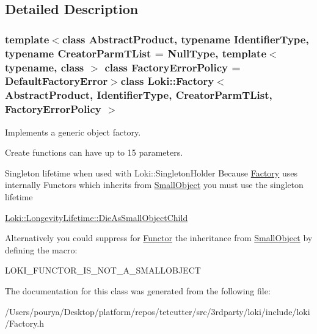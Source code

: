 \subsection{Detailed Description}
\subsubsection*{template$<$class Abstract\+Product, typename Identifier\+Type, typename Creator\+Parm\+T\+List = Null\+Type, template$<$ typename, class $>$ class Factory\+Error\+Policy = Default\+Factory\+Error$>$class Loki\+::\+Factory$<$ Abstract\+Product, Identifier\+Type, Creator\+Parm\+T\+List, Factory\+Error\+Policy $>$}

Implements a generic object factory.

Create functions can have up to 15 parameters.

\begin{DoxyParagraph}{Singleton lifetime when used with Loki\+:\+:Singleton\+Holder}
Because \hyperlink{classLoki_1_1Factory}{Factory} uses internally Functors which inherits from \hyperlink{classLoki_1_1SmallObject}{Small\+Object} you must use the singleton lifetime 
\begin{DoxyCode}
\hyperlink{structLoki_1_1LongevityLifetime_1_1DieAsSmallObjectChild}{Loki::LongevityLifetime::DieAsSmallObjectChild} 
\end{DoxyCode}
 Alternatively you could suppress for \hyperlink{classLoki_1_1Functor}{Functor} the inheritance from \hyperlink{classLoki_1_1SmallObject}{Small\+Object} by defining the macro\+: 
\begin{DoxyCode}
LOKI\_FUNCTOR\_IS\_NOT\_A\_SMALLOBJECT 
\end{DoxyCode}
 
\end{DoxyParagraph}


The documentation for this class was generated from the following file\+:\begin{DoxyCompactItemize}
\item 
/\+Users/pourya/\+Desktop/platform/repos/tetcutter/src/3rdparty/loki/include/loki/Factory.\+h\end{DoxyCompactItemize}
